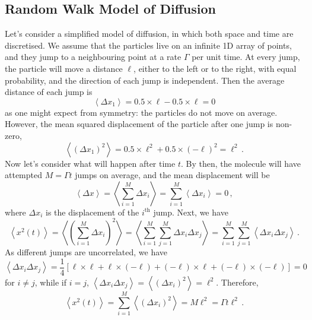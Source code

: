 \documentclass{article}
\theoremstyle{plain}\theoremheaderfont{\normalfont\bfseries}\theorembodyfont{\rmfamily}\theoremseparator{.}\newtheorem*{thm}{Theorem}\newtheorem*{law}{Law}\newtheorem*{pos}{Postulate}
\numberwithin{equation}{section}
\newcommand{\eval}[1]{\left\langle #1 \right\rangle}
\begin{document}
    \subsection{Random Walk Model of Diffusion}
    Let's consider a simplified model of diffusion, in which both space and time are discretised. We assume that the particles live on an infinite 1D array of points, and they jump to a neighbouring point at a rate \(\Gamma\) per unit time. At every jump, the particle will move a distance \(\ell\), either to the left or to the right, with equal probability, and the direction of each jump is independent. Then the average distance of each jump is
    \begin{equation}
        \eval{\Delta x_1}=0.5\times\ell-0.5\times\ell=0
    \end{equation}
    as one might expect from symmetry: the particles do not move on average. However, the mean squared displacement of the particle after one jump is non-zero,
    \begin{equation}
        \eval{(\Delta x_1)^2}=0.5\times\ell^2+0.5\times (-\ell)^2=\ell^2\,.
    \end{equation}
    Now let's consider what will happen after time \(t\). By then, the molecule will have attempted \(M=\Gamma t\) jumps on average, and the mean displacement will be
    \begin{equation}
        \eval{\Delta x}=\eval{\sum_{i=1}^{M}\Delta x_i}=\sum_{i=1}^{M}\eval{\Delta x_i}=0\,,
    \end{equation}
    where \(\Delta x_i\) is the displacement of the \(i^{\text{th}}\) jump. Next, we have
    \begin{equation}
        \eval{x^2(t)}=\eval{\left(\sum_{i=1}^{M}\Delta x_i\right)^2}=\eval{\sum_{i=1}^{M}\sum_{j=1}^{M}\Delta x_i\Delta x_j}=\sum_{i=1}^{M}\sum_{j=1}^{M}\eval{\Delta x_i\Delta x_j}\,.
    \end{equation}
    As different jumps are uncorrelated, we have
    \begin{equation}
        \eval{\Delta x_i\Delta x_j}=\frac{1}{4}[\ell\times\ell+\ell\times(-\ell)+(-\ell)\times \ell+(-\ell)\times(-\ell)]=0
    \end{equation}
    for \(i\ne j\), while if \(i=j\), \(\eval{\Delta x_i\Delta x_j}=\eval{(\Delta x_i)^2}=\ell^2\). Therefore,
    \begin{equation}
        \eval{x^2(t)}=\sum_{i=1}^{M}\eval{(\Delta x_i)^2}=M\ell^2=\Gamma t\ell^2\,.
    \end{equation}
    
\end{document}
